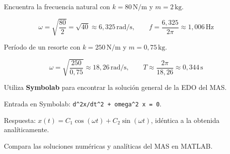 \documentclass[12pt, a4paper, oneside]{book}
\newcommand{\Nm}{\,\text{N/m}}
\newcommand{\rad}{\,\text{rad/s}}
\newcommand{\Hz}{\,\text{Hz}}
\newcommand{\kg}{\,\text{kg}}
\begin{document}
\begin{problema}[title={Problema~27}]
Encuentra la frecuencia natural con $k = 80\Nm$ y $m = 2\kg$.
\end{problema}

\begin{solucion}
\[
  \omega = \sqrt{\dfrac{80}{2}} = \sqrt{40} \approx 6{,}325\rad,\qquad
  \boxed{f = \dfrac{6{,}325}{2\pi} \approx 1{,}006\Hz}
\]
\end{solucion}

\begin{problema}[title={Problema~28}]
Per\'iodo de un resorte con $k = 250\Nm$ y $m = 0{,}75\kg$.
\end{problema}

\begin{solucion}
\[
  \omega = \sqrt{\dfrac{250}{0{,}75}} \approx 18{,}26\rad,\qquad
  \boxed{T \approx \dfrac{2\pi}{18{,}26} \approx 0{,}344\,\text{s}}
\]
\end{solucion}

\begin{problema}[title={Problema~29}]
Utiliza \textbf{Symbolab} para encontrar la soluci\'on general de la EDO del MAS.
\end{problema}

\begin{solucion}
Entrada en Symbolab: \texttt{d\^{}2x/dt\^{}2 + omega\^{}2 x = 0}.

Respuesta: $x(t) = C_{1}\cos(\omega t) + C_{2}\sin(\omega t)$, id\'entica
a la obtenida anal\'iticamente.
\end{solucion}

\begin{problema}[title={Problema~30}]
Compara las soluciones num\'ericas y anal\'iticas del MAS en MATLAB.
\end{problema}
\end{document}
